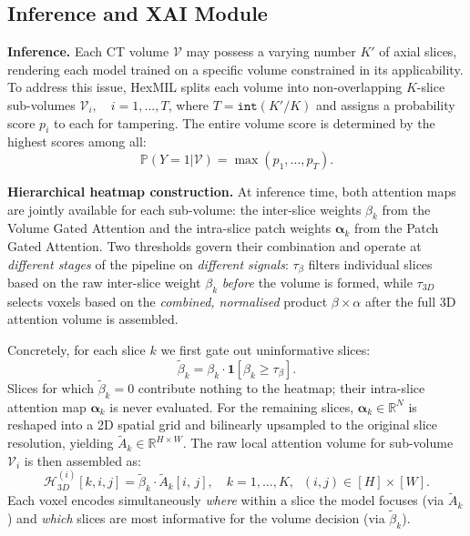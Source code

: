 \documentclass[sigconf, screen, review, anonymous]{acmart}
\begin{document}
\subsection{Inference and XAI Module}
\label{sec:xai}

\noindent\textbf{Inference.}
Each CT volume $\mathcal{V}$ may possess a varying number $K'$ of axial slices, rendering each model trained on a specific volume constrained in its applicability. To address this issue, HexMIL splits each volume into non-overlapping $K$-slice sub-volumes $\mathcal{V}_i, \quad i=1,\dots,T$, where $T=\texttt{int}(K'/K)$ and assigns a probability score $p_i$ to each for tampering. The entire volume score is determined by the highest scores among all:
\begin{equation}
    \mathbb{P}(Y=1|\mathcal{V})=\max(p_1,\dots,p_T).
\end{equation}


\noindent\textbf{Hierarchical heatmap construction.}
At inference time, both attention maps are jointly available for each sub-volume: the inter-slice weights $\beta_k$ from the Volume Gated Attention and the intra-slice patch weights $\boldsymbol{\alpha}_k$ from the Patch Gated Attention. Two thresholds govern their combination and operate at \emph{different stages} of the pipeline on \emph{different signals}: $\tau_\beta$ filters individual slices based on the raw inter-slice weight $\beta_k$ \emph{before} the volume is formed, while $\tau_{3D}$ selects voxels based on the \emph{combined, normalised} product $\beta \times \alpha$ after the full 3D attention volume is assembled.

Concretely, for each slice $k$ we first gate out uninformative slices:
%
\begin{equation}
    \tilde{\beta}_k = \beta_k \cdot \mathbf{1}[\beta_k \geq \tau_\beta].
    \label{eq:beta_mask}
\end{equation}
%
Slices for which $\tilde{\beta}_k = 0$ contribute nothing to the heatmap; their intra-slice attention map $\boldsymbol{\alpha}_k$ is never evaluated. For the remaining slices, $\boldsymbol{\alpha}_k \in \mathbb{R}^N$ is reshaped into a 2D spatial grid and bilinearly upsampled to the original slice resolution, yielding $\tilde{A}_k \in \mathbb{R}^{H \times W}$. The raw local attention volume for sub-volume $\mathcal{V}_i$ is then assembled as:
%
\begin{equation}
    \mathcal{H}^{(i)}_{3D}[k, i, j] = \tilde{\beta}_k \cdot \tilde{A}_k[i,\, j],
    \quad k = 1,\ldots,K,\;\; (i,j) \in [H]\!\times\![W].
    \label{eq:heatmap}
\end{equation}
%
Each voxel encodes simultaneously \emph{where} within a slice the model focuses (via $\tilde{A}_k$) and \emph{which} slices are most informative for the volume decision (via $\tilde{\beta}_k$).
\end{document}
